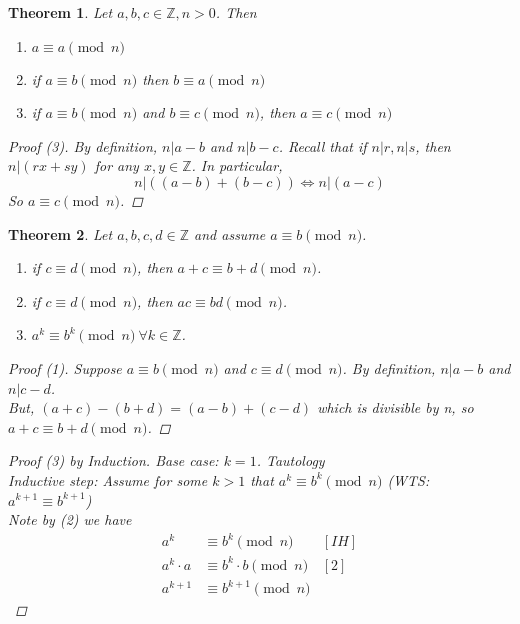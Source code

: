 \documentclass[letterpaper]{article}
\newtheorem{theorem}{Theorem}[section]
\begin{document}
    \begin{theorem}
        Let $a,b,c\in\mathbb{Z}, n>0$. Then
        \begin{enumerate}
            \item $a\equiv a \pmod{n}$
            \item if $a\equiv b \pmod{n}$ then $b\equiv a \pmod{n}$
            \item if $a\equiv b \pmod{n}$ and $b\equiv c \pmod{n}$, then
            $a\equiv c \pmod{n}$
        \end{enumerate}
        \begin{proof} [Proof (3)]
            By definition, $n|a-b$ and $n|b-c$. Recall that if $n|r, n|s$, 
            then $n|(rx+sy)$ for any $x,y\in\mathbb{Z}$. In particular,
            \[
                n|((a-b)+(b-c)) \Leftrightarrow n|(a-c)
            \]
            So $a\equiv c \pmod{n}$.
        \end{proof}
    \end{theorem}

    \begin{theorem}
        Let $a,b,c,d\in\mathbb{Z}$ and assume $a\equiv b \pmod{n}$.
        \begin{enumerate}
            \item if $c\equiv d \pmod{n}$, then $a+c\equiv b+d\pmod{n}$.
            \item if $c\equiv d \pmod{n}$, then $ac\equiv bd \pmod{n}$.
            \item $a^k\equiv b^k \pmod{n}\ \forall k\in\mathbb{Z}$.
        \end{enumerate}
        \begin{proof} [Proof (1)]
            Suppose $a\equiv b \pmod{n}$ and $c\equiv d \pmod{n}$. By definition,
            $n|a-b$ and $n|c-d$. \\
            But, $(a+c)-(b+d)=(a-b)+(c-d)$ which is divisible by n, so 
            $a+c\equiv b+d \pmod{n}$.
        \end{proof}
        \begin{proof} [Proof (3) by Induction]
            Base case: $k=1$. Tautology \\
            Inductive step: Assume for some $k>1$ that $a^k\equiv b^k \pmod{n}$
            (WTS: $a^{k+1}\equiv b^{k+1}$) \\
            Note by (2) we have 
            \begin{align*}
                a^k & \equiv b^k \pmod{n} & [IH]\\
                a^k\cdot a & \equiv b^k\cdot b \pmod{n} & [2]\\
                a^{k+1} & \equiv b^{k+1} \pmod{n}
            \end{align*}
        \end{proof}

    \end{theorem}
    
\end{document}
